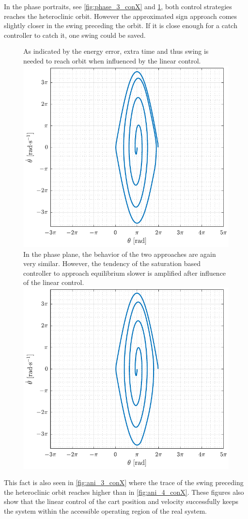 %
In the phase portraits, see \autoref{fig:phase_3_conX} and \ref{fig:phase_4_conX}, both control strategies reaches the heteroclinic orbit. However the approximated sign approach comes slightly closer in the swing preceding the orbit. If it is close enough for a catch controller to catch it, one swing could be saved.
\begin{figure}[H]
  \hspace{-10pt}
  \captionbox
  {
    As indicated by the energy error, extra time and thus swing is needed to reach orbit when influenced by the linear control.
    \label{fig:phase_3_conX}
  }
  {
    \hspace{-1cm}
    \includegraphics[width=.46\textwidth]{figures/phase_3_conX}
  }
  \hspace{20pt}
  \captionbox 
  {
    In the phase plane, the behavior of the two approaches are again very similar. However, the tendency of the saturation based controller to approach equilibrium slower is amplified after influence of the linear control.
    \label{fig:phase_4_conX}
  }
  {
    \hspace{-1cm}
    \includegraphics[width=.46\textwidth]{figures/phase_4_conX}
  }  
\end{figure}
%
This fact is also seen in \autoref{fig:ani_3_conX} where the trace of the swing preceding the heteroclinic orbit reaches higher than in \autoref{fig:ani_4_conX}. These figures also show that the linear control of the cart position and velocity successfully keeps the system within the accessible operating region of the real system.
